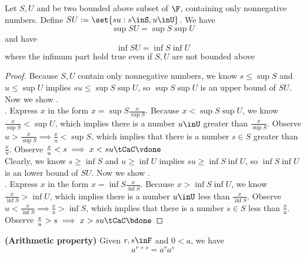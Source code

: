 \documentclass{report}
\begin{document}
\begin{lemma}
\label{1.4.5}
Let $S,U$ and be two bounded above subset of  $\F$, containing only nonnegative numbers. Define $SU:=\set{su:s\inS,u\inU}$. We have    
\begin{equation}
\sup SU=\sup S \sup U 
\end{equation}
and have 
\begin{equation}
\inf SU=\inf S\inf U
\end{equation}
where the infimum part hold true even if $S,U$ are not bounded above 
\end{lemma}
\begin{proof}
Because $S,U$ contain only nonnegative numbers, we know $s\leq \sup S$ and $u\leq \sup U$ implies $su\leq \sup S \sup U$, so $\sup S \sup U$ is an upper bound of $SU$. Now we show .\\

. Express $x$ in the form  $x=\sup S \frac{x}{\sup S}$. Because $x<\sup S \sup U $, we know $\frac{x}{\sup S}<\sup U$, which implies there is a number  $u\inU$ greater than $\frac{x}{\sup S}$. Observe $u>\frac{x}{\sup S}\implies \frac{x}{u}<\sup S$, which implies that there is a number $s\in S$ greater than  $\frac{x}{u}$. Observe  $\frac{x}{u}<s\implies x<su \tCaC\vdone$\\ 

Clearly, we know $s\geq \inf  S$ and $u\geq \inf  U$ implies $su\geq \inf  S \inf  U$, so $\inf  S \inf  U$ is an lower bound of $SU$. Now we show .\\

. Express $x$ in the form  $x=\inf  S \frac{x}{\inf  S}$. Because $x>\inf  S \inf  U $, we know $\frac{x}{\inf  S}>\inf  U$, which implies there is a number  $u\inU$ less than $\frac{x}{\inf  S}$. Observe $u<\frac{x}{\inf  S}\implies \frac{x}{u}>\inf  S$, which implies that there is a number $s\in S$ less than  $\frac{x}{u}$. Observe  $\frac{x}{u}>s\implies x>su \tCaC\bdone$  
\end{proof}

\begin{theorem}
\label{1.4.6}
\textbf{(Arithmetic property)} Given $r,s\inF$ and $0<a$, we have
\begin{equation}
  a^{r+s}=a^ra^s
\end{equation}
\end{theorem}
\end{document}
